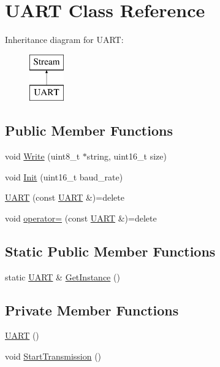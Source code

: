 \hypertarget{class_u_a_r_t}{}\section{U\+A\+RT Class Reference}
\label{class_u_a_r_t}
Inheritance diagram for U\+A\+RT\+:\begin{figure}[H]
\begin{center}
\leavevmode
\includegraphics[height=2.000000cm]{class_u_a_r_t}
\end{center}
\end{figure}
\subsection*{Public Member Functions}
\begin{DoxyCompactItemize}
\item 
void \hyperlink{class_u_a_r_t_a8bb77ca27b4e17d608d2743313625ac4}{Write} (uint8\+\_\+t $\ast$string, uint16\+\_\+t size)
\item 
void \hyperlink{class_u_a_r_t_aed659ee8bc31ba966144d1a522506a7b}{Init} (uint16\+\_\+t baud\+\_\+rate)
\item 
\hyperlink{class_u_a_r_t_a97debffc29b178c09b104f4542298a36}{U\+A\+RT} (const \hyperlink{class_u_a_r_t}{U\+A\+RT} \&)=delete
\item 
void \hyperlink{class_u_a_r_t_a843ab7fc20f5ce5f030d2ca5ee98d6b6}{operator=} (const \hyperlink{class_u_a_r_t}{U\+A\+RT} \&)=delete
\end{DoxyCompactItemize}
\subsection*{Static Public Member Functions}
\begin{DoxyCompactItemize}
\item 
static \hyperlink{class_u_a_r_t}{U\+A\+RT} \& \hyperlink{class_u_a_r_t_a745c8f35f3ca3ab6359cedda3e640777}{Get\+Instance} ()
\end{DoxyCompactItemize}
\subsection*{Private Member Functions}
\begin{DoxyCompactItemize}
\item 
\hyperlink{class_u_a_r_t_a68e7e88d2a13f5da85f0fde1ef98515f}{U\+A\+RT} ()
\item 
void \hyperlink{class_u_a_r_t_a0569d0267f8045907cedb527b5082fe0}{Start\+Transmission} ()
\end{DoxyCompactItemize}
